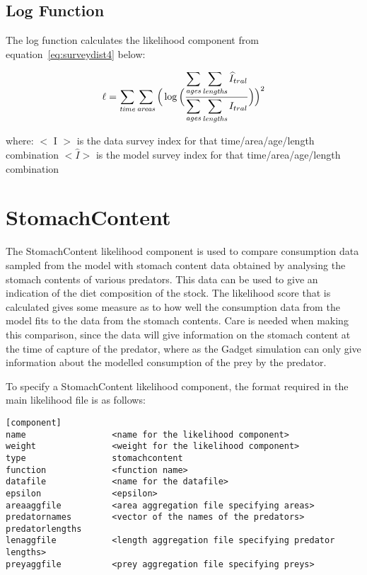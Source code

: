 \documentclass[10pt,twoside]{book}
\begin{document}
\subsection{Log Function}
The log function calculates the likelihood component from equation~\ref{eq:surveydist4} below:

\begin{equation}\label{eq:surveydist4}
\ell = \sum_{\it time}\sum_{\it areas} \Big(  \log \Big( {\frac{ \displaystyle \sum_{\it ages}\sum_{\it lengths}  \widehat{I}_{tral}} { \displaystyle \sum_{\it ages}\sum_{\it lengths} I_{tral}}} \Big) \Big) ^2
\end{equation}

where:\newline
$<$ I $>$ is the data survey index for that time/area/age/length combination\newline
$<\widehat{I}>$ is the model survey index for that time/area/age/length combination

\section{StomachContent}\label{sec:stomach}
The StomachContent likelihood component is used to compare consumption data sampled from the model with stomach content data obtained by analysing the stomach contents of various predators.  This data can be used to give an indication of the diet composition of the stock.  The likelihood score that is calculated gives some measure as to how well the consumption data from the model fits to the data from the stomach contents.  Care is needed when making this comparison, since the data will give information on the stomach content at the time of capture of the predator, where as the Gadget simulation can only give information about the modelled consumption of the prey by the predator.

\bigskip
To specify a StomachContent likelihood component, the format required in the main likelihood file is as follows:

{\small\begin{verbatim}
[component]
name                 <name for the likelihood component>
weight               <weight for the likelihood component>
type                 stomachcontent
function             <function name>
datafile             <name for the datafile>
epsilon              <epsilon>
areaaggfile          <area aggregation file specifying areas>
predatornames        <vector of the names of the predators>
predatorlengths
lenaggfile           <length aggregation file specifying predator lengths>
preyaggfile          <prey aggregation file specifying preys>
\end{verbatim}}
\end{document}
